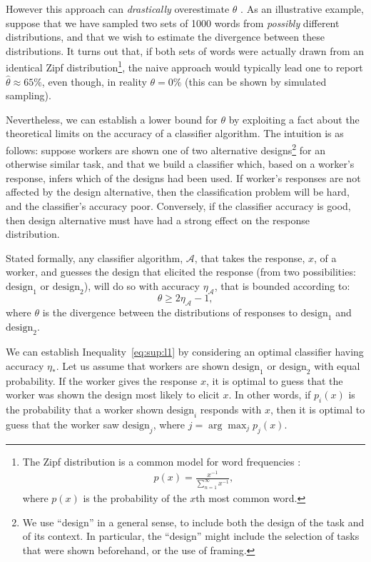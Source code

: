 \documentclass{sigchi}
\begin{document}
However this approach can \textit{drastically} overestimate $\theta$
\cite{val-thesis}.  As an illustrative example,
suppose that we have sampled two sets of 1000 words from \textit{possibly} 
different distributions, and that we wish to estimate the divergence 
between these distributions.  
It turns out that, if both sets of words were actually drawn from 
an identical Zipf distribution\footnote{The 
  Zipf distribution is a common model for word frequencies 
  \cite{powers1998applications,zipf1949human}:
  \begin{align}
	p(x) = \frac{x^{-1}}{\sum_{n=1}^{\infty}x^{-1}},
	\label{eq:zipf}
  \end{align}
  where $p(x)$ is the probability of the $x$th most common word.
}, the naive approach would typically lead one to report 
$\hat{\theta} \approx 65\%$, even though, in reality $\theta = 0\%$
(this can be shown by simulated sampling).

Nevertheless, we can establish a lower bound for $\theta$ by 
exploiting a fact about the theoretical limits on the accuracy of a 
classifier algorithm.  The intuition is as follows: 
suppose workers are shown one of two alternative designs\footnote{We
use ``design'' in a general sense, to include both the design of the task
and of its context.  In particular, the ``design'' might include the
selection of tasks that were shown beforehand, or the use of framing.}
for an otherwise
similar task, and that we build a classifier which, 
based on a worker's response, infers which of the designs had been 
used.
If worker's responses are not affected by the design alternative,
then the classification problem will be hard, and the classifier's 
accuracy poor.
Conversely, if the classifier accuracy is good, then design alternative 
must have had a strong effect on the response distribution.

Stated formally, any classifier algorithm, $\mathcal{A}$, that
takes the response, $x$, of a worker, and guesses the 
design that elicited the response (from two possibilities:
$\mathrm{design}_1$ or $\mathrm{design}_2$), will do so with accuracy 
$\eta_\mathcal{A}$, that is bounded according to:
\begin{equation}
	\theta \geq 2\eta_\mathcal{A} - 1,
	\label{eq:sup:l1}
\end{equation}
where $\theta$ is the divergence between the distributions of responses
to $\mathrm{design}_1$ and $\mathrm{design}_2$.

We can establish Inequality~\ref{eq:sup:l1} by considering an
optimal classifier having accuracy $\eta_*$.  
Let us assume that workers are shown 
$\mathrm{design}_1$ or $\mathrm{design}_2$ with equal probability.
If the worker gives the response $x$, it is optimal to guess
that the worker was shown the design most likely to elicit $x$.
In other words, if $p_i(x)$ is the probability that a worker shown 
$\mathrm{design}_i$ responds with $x$, then it is optimal to 
guess that the worker saw $\mathrm{design}_j$, where 
$j = \arg\max_j{p_j(x)}$.
\end{document}
